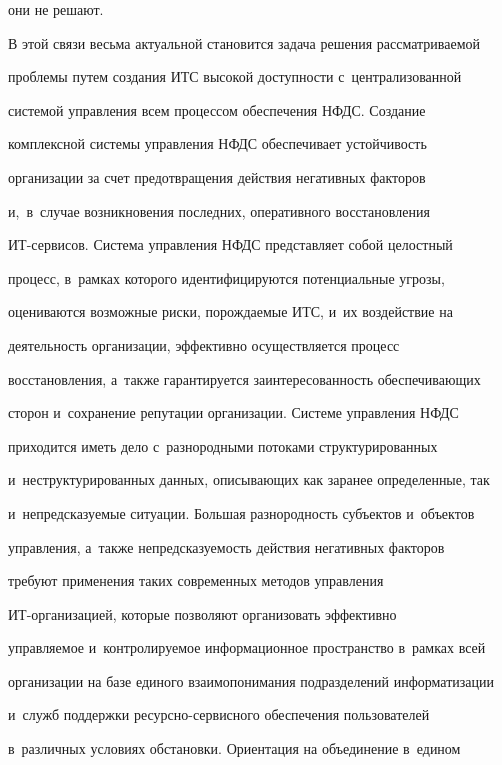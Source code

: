 они не решают.





  В этой связи весьма актуальной становится задача решения рассмат\-ри\-ва\-емой


проблемы путем создания ИТС высокой доступности с~централизованной


сис\-те\-мой управ\-ле\-ния всем процессом обеспечения НФДС. Создание


комплексной сис\-те\-мы управ\-ле\-ния НФДС обеспечивает устойчивость


организации за счет пред\-от\-вра\-ще\-ния действия негативных факторов


и,~в~случае возникновения последних, оперативного восстановления


  ИТ-сер\-ви\-сов. Система управ\-ле\-ния НФДС представляет собой целостный


процесс, в~рамках которого идентифицируются потенциальные угрозы,


оцениваются возможные риски, порождаемые ИТС, и~их воздействие на


деятельность организации, эффективно осуществляется процесс


восстановления, а~так\-же гарантируется заинтересованность обеспечивающих


сторон и~сохранение репутации организации. Системе управ\-ле\-ния НФДС


приходится иметь дело с~разнородными потоками структурированных


и~неструктурированных данных, описывающих как заранее определенные, так


и~непредсказуемые ситуации. Большая разнородность субъектов и~объектов


управ\-ле\-ния, а~так\-же непредсказуемость действия негативных факторов


требуют применения таких современных методов управ\-ле\-ния


ИТ-ор\-га\-ни\-за\-ци\-ей, которые позволяют организовать эффективно


управ\-ля\-емое и~контролируемое информационное пространство в~рамках всей


организации на базе единого взаимопонимания подразделений информатизации


и~служб поддержки ре\-сурс\-но-сер\-вис\-но\-го обеспечения пользователей


в~различных условиях обстановки. Ориентация на объединение в~едином


